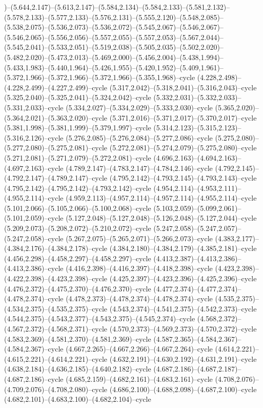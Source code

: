 )--(5.644,2.147)--(5.613,2.147)--(5.584,2.134)--(5.584,2.133)--(5.581,2.132)--(5.578,2.133)--(5.577,2.133)--(5.576,2.131)--(5.555,2.120)--(5.548,2.085)--(5.538,2.075)--(5.536,2.073)--(5.536,2.072)--(5.545,2.067)--(5.546,2.067)--(5.546,2.065)--(5.556,2.056)--(5.557,2.055)--(5.557,2.053)--(5.567,2.044)--(5.545,2.041)--(5.533,2.051)--(5.519,2.038)--(5.505,2.035)--(5.502,2.020)--(5.482,2.020)--(5.473,2.013)--(5.469,2.000)--(5.456,2.004)--(5.438,1.994)--(5.433,1.983)--(5.440,1.964)--(5.426,1.955)--(5.420,1.952)--(5.409,1.961)--(5.372,1.966)--(5.372,1.966)--(5.372,1.966)--(5.355,1.968)--cycle (4.228,2.498)--(4.228,2.499)--(4.227,2.499)--cycle (5.317,2.042)--(5.318,2.041)--(5.316,2.043)--cycle (5.325,2.040)--(5.325,2.041)--(5.324,2.042)--cycle (5.332,2.031)--(5.332,2.033)--(5.331,2.033)--cycle (5.334,2.027)--(5.334,2.029)--(5.333,2.030)--cycle (5.365,2.020)--(5.364,2.021)--(5.363,2.020)--cycle (5.371,2.016)--(5.371,2.017)--(5.370,2.017)--cycle (5.381,1.998)--(5.381,1.999)--(5.379,1.997)--cycle (5.314,2.123)--(5.315,2.123)--(5.316,2.126)--cycle (5.276,2.085)--(5.276,2.084)--(5.277,2.086)--cycle (5.275,2.080)--(5.277,2.080)--(5.275,2.081)--cycle (5.272,2.081)--(5.274,2.079)--(5.275,2.080)--cycle (5.271,2.081)--(5.271,2.079)--(5.272,2.081)--cycle (4.696,2.163)--(4.694,2.163)--(4.697,2.163)--cycle (4.789,2.147)--(4.783,2.147)--(4.784,2.146)--cycle (4.792,2.145)--(4.792,2.147)--(4.789,2.147)--cycle (4.795,2.142)--(4.793,2.145)--(4.793,2.143)--cycle (4.795,2.142)--(4.795,2.142)--(4.793,2.142)--cycle (4.954,2.114)--(4.953,2.111)--(4.955,2.114)--cycle (4.959,2.113)--(4.957,2.114)--(4.957,2.114)--(4.955,2.114)--cycle (5.101,2.066)--(5.105,2.066)--(5.100,2.068)--cycle (5.103,2.059)--(5.099,2.061)--(5.101,2.059)--cycle (5.127,2.048)--(5.127,2.048)--(5.126,2.048)--(5.127,2.044)--cycle (5.209,2.073)--(5.208,2.072)--(5.210,2.072)--cycle (5.247,2.058)--(5.247,2.057)--(5.247,2.058)--cycle (5.267,2.075)--(5.265,2.071)--(5.266,2.073)--cycle (4.383,2.177)--(4.384,2.176)--(4.384,2.178)--cycle (4.384,2.180)--(4.384,2.179)--(4.385,2.181)--cycle (4.456,2.298)--(4.458,2.297)--(4.458,2.297)--cycle (4.413,2.387)--(4.413,2.386)--(4.413,2.386)--cycle (4.416,2.398)--(4.416,2.397)--(4.418,2.398)--cycle (4.423,2.398)--(4.422,2.398)--(4.423,2.398)--cycle (4.425,2.397)--(4.423,2.396)--(4.425,2.396)--cycle (4.476,2.372)--(4.475,2.370)--(4.476,2.370)--cycle (4.477,2.374)--(4.477,2.374)--(4.478,2.374)--cycle (4.478,2.373)--(4.478,2.374)--(4.478,2.374)--cycle (4.535,2.375)--(4.534,2.375)--(4.535,2.375)--cycle (4.543,2.374)--(4.541,2.375)--(4.542,2.373)--cycle (4.544,2.375)--(4.543,2.377)--(4.543,2.375)--(4.545,2.374)--cycle (4.568,2.372)--(4.567,2.372)--(4.568,2.371)--cycle (4.570,2.373)--(4.569,2.373)--(4.570,2.372)--cycle (4.583,2.369)--(4.581,2.370)--(4.581,2.369)--cycle (4.587,2.365)--(4.584,2.367)--(4.584,2.367)--cycle (4.667,2.265)--(4.667,2.266)--(4.667,2.264)--cycle (4.614,2.221)--(4.615,2.221)--(4.614,2.221)--cycle (4.632,2.191)--(4.630,2.192)--(4.631,2.191)--cycle (4.638,2.184)--(4.636,2.185)--(4.640,2.182)--cycle (4.687,2.186)--(4.687,2.187)--(4.687,2.186)--cycle (4.685,2.159)--(4.682,2.161)--(4.683,2.161)--cycle (4.708,2.076)--(4.709,2.076)--(4.708,2.080)--cycle (4.686,2.100)--(4.688,2.098)--(4.687,2.100)--cycle (4.682,2.101)--(4.683,2.100)--(4.682,2.104)--cycle 